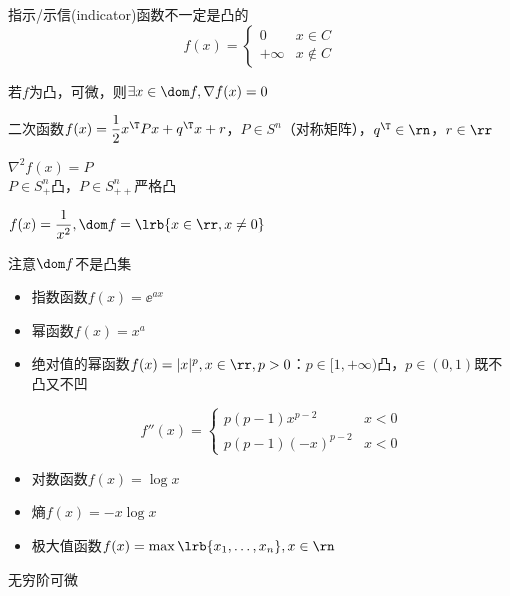 \documentclass{note}
\begin{document}
指示/示信(indicator)函数不一定是凸的
\[f(x)=\begin{cases}0&x\in C\\ +\infty & x\notin C\end{cases}\]

\begin{theorem}
若$f$为凸，可微，则$\exists x\in\dom f,\nabla f(x)=0$
\end{theorem}

\begin{example}
二次函数$f(x)=\dfrac{1}{2}x^\T Px+q^\T x+r$，$P\in S^n$（对称矩阵），$q^\T\in\rn$，$r\in\rr$
\end{example}
\begin{analysis}
$\nabla^2 f(x)=P$\\
$P\in S^n_+$凸，$P\in S_{++}^n$严格凸
\end{analysis}

\begin{example}
$f(x)=\dfrac{1}{x^2},\dom f=\lrb{x\in\rr,x\ne 0}$
\end{example}
\begin{analysis}
注意$\dom f$不是凸集
\end{analysis}
\begin{itemize}
	\item 指数函数$f(x)=\ee^{ax}$
	\item 幂函数$f(x)=x^a$
	\item 绝对值的幂函数$f(x)=|x|^p,x\in\rr,p>0$：$p\in[1,+\infty)$凸，$p\in(0,1)$既不凸又不凹
	\begin{analysis}
	\[f''(x)=\begin{cases}
	p(p-1)x^{p-2} & x<0\\
	p(p-1)(-x)^{p-2} & x<0
	\end{cases}\]
	\end{analysis}
	\item 对数函数$f(x)=\log x$
	\item 熵$f(x)=-x\log x$
	\item 极大值函数$f(x)=\max\lrb{x_1,\ldots,x_n},x\in\rn$
\end{itemize}

\begin{definition}[解析近似]
无穷阶可微
\end{definition}
\end{document}
